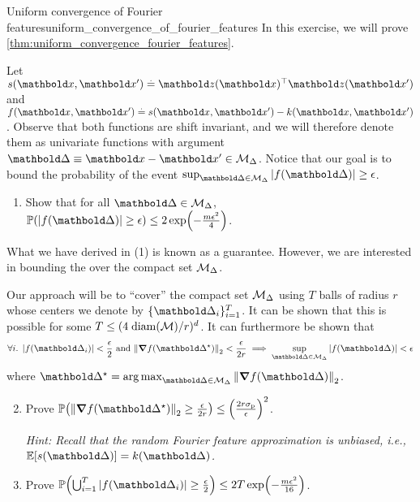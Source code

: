\begin{nexercise}{Uniform convergence of Fourier features}{uniform_convergence_of_fourier_features}
  In this exercise, we will prove \cref{thm:uniform_convergence_fourier_features}.

  Let $s(\vx, \vxp) \defeq \transpose{\vz(\vx)} \vz(\vxp)$ and $f(\vx, \vxp) \defeq s(\vx, \vxp) - k(\vx, \vxp)$.
  Observe that both functions are shift invariant, and we will therefore denote them as univariate functions with argument $\vDelta \equiv \vx - \vxp \in \spM_\Delta$.
  Notice that our goal is to bound the probability of the event $\sup_{\vDelta \in \spM_\Delta} |f(\vDelta)| \geq \epsilon$.

  \begin{enumerate}
    \item Show that for all $\vDelta \in \spM_\Delta$, $\Pr{|f(\vDelta)| \geq \epsilon} \leq 2 \exp\parentheses*{-\frac{m \epsilon^2}{4}}$.
  \end{enumerate}

  What we have derived in (1) is known as a  guarantee.
  However, we are interested in bounding the  over the compact set $\mathcal{M}_\Delta$.

  Our approach will be to ``cover'' the compact set $\mathcal{M}_\Delta$ using $T$ balls of radius $r$ whose centers we denote by $\{\vDelta_i\}_{i=1}^T$.
  It can be shown that this is possible for some $T \leq (4 \; \mathrm{diam}(\mathcal{M}) / r)^d$.
  It can furthermore be shown that \begin{align*}
    \text{$\forall i$. $|f(\vDelta_i)| < \frac{\epsilon}{2}$ and $\norm{\grad f(\opt{\vDelta})}_2 < \frac{\epsilon}{2 r}$} \implies \sup_{\vDelta \in \spM_\Delta} |f(\vDelta)| < \epsilon
  \end{align*} where $\opt{\vDelta} = \argmax_{\vDelta \in \spM_\Delta} \norm{\grad f(\vDelta)}_2$.

  \begin{enumerate}
    \setcounter{enumi}{1}
    \item Prove $\Pr{\norm{\grad f(\opt{\vDelta})}_2 \geq \frac{\epsilon}{2 r}} \leq \parentheses*{\frac{2 r \sigmap}{\epsilon}}^2$.\par
    \textit{Hint: Recall that the random Fourier feature approximation is unbiased, i.e., $\E{s(\vDelta)} = k(\vDelta)$.}

    \item Prove $\Pr{\bigcup_{i=1}^T |f(\vDelta_i)| \geq \frac{\epsilon}{2}} \leq 2 T \exp\parentheses*{-\frac{m \epsilon^2}{16}}$.


\end{enumerate}
\end{nexercise}
